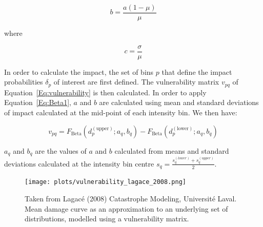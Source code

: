 \documentclass[a4paper,11pt]{extarticle} %
\theoremstyle{definition}
\begin{document}
\begin{equation}
    \label{Eq:BetaB}
    b = \frac{a(1 - \mu)}{\mu}
\end{equation}

where

\begin{equation}
    \label{Eq:BetaC}
    c = \frac{\sigma}{\mu}
\end{equation}

In order to calculate the impact, the set of bins $p$ that define the impact probabilities $\delta_p$ of interest are first defined. The vulnerability matrix $v_{pq}$ of Equation~\ref{Eq:vulnerability} is then calculated. In order to apply Equation~\ref{Eq:Beta1}, $a$ and $b$ are calculated using mean and standard deviations of impact calculated at the mid-point of each intensity bin. We then have:

\begin{equation}
    \label{Eq:BetaVuln}
    v_{pq} = F_{\text{Beta}}(d_p^{(\text{upper})}; a_q, b_q) - F_{\text{Beta}}(d_p^{(\text{lower})}; a_q, b_q)
\end{equation}

$a_q$ and $b_q$ are the values of $a$ and $b$ calculated from means and standard deviations calculated at the intensity bin centre $s_q = \frac{s_q^{(lower)} + s_q^{(upper)}}{2}$.

\begin{figure}[ht]

    \begin{framed}

        \texttt{[image: plots/vulnerability\_lagace\_2008.png]}

    \end{framed}

    \footnotesize

    \renewcommand{\arraystretch}{1.01}

    \vspace{-3ex}


    \vspace{-0.5ex}

    \caption{\small Taken from Lagacé (2008) Catastrophe Modeling, Université Laval. Mean damage curve as an approximation to an underlying set of distributions, modelled using a vulnerability matrix.}
    \label{Fig:vulnerability_matrix}

\end{figure}
\end{document}
